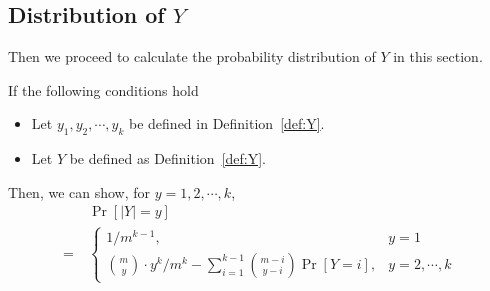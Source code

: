 \subsection{Distribution of \texorpdfstring{$Y$}{}}\label{sec:distribution_Y}
Then we proceed to calculate the probability distribution of $Y$ in this section.
\begin{lemma}[Distribution of $Y$]\label{lem:distribution_of_Y}
If the following conditions hold
\begin{itemize}
    \item Let $y_1, y_2, \cdots , y_k$ be defined in Definition~\ref{def:Y}.
    \item Let $Y$ be defined as Definition~\ref{def:Y}.
\end{itemize}

Then, we can show, for $y = 1, 2, \cdots, k$, 
\begin{align*}
    & ~ \Pr[|Y| = y] \\
    = & ~ \begin{cases}
        1 / m^{k-1},  & y = 1 \\
        \binom{m}{y} \cdot y ^k / m^k
        - \sum_{i=1}^{k-1} \binom{m - i}{y -i} \Pr[Y = i], & y = 2, \cdots , k
    \end{cases}
\end{align*}
\end{lemma}


